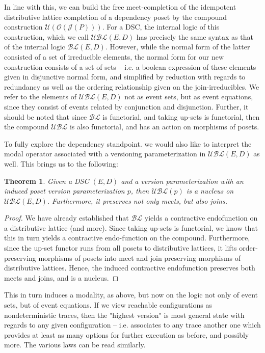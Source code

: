 \documentclass[hoptionsi,review,format=acmsmall]{acmart}
\newtheorem{theorem}{Theorem}[section]
\theoremstyle{definition}
\newcommand{\UBLc}{\mathcal{UBL}}
\newcommand{\Oc}{\mathcal{O}}
\newcommand{\Ucc}{\mathcal{U}}
\newcommand{\Jc}{\mathcal{J}}
\newcommand{\BLc}{\mathcal{BL}}
\begin{document}
 In line with this, we can build the free meet-completion of the idempotent distributive lattice completion of a dependency poset by the compound construction \(\Ucc(\Oc(\Jc(P)))\). For a DSC, the internal logic of this construction, which we call \(\UBLc(E,D)\) has precisely the same syntax as that of the internal logic \(\BLc(E,D)\). However, while the normal form of the latter consisted of a set of irreducible elements, the normal form for our new construction consists of a set of sets -- i.e. a boolean expression of these elements given in disjunctive normal form, and simplified by reduction with regards to redundancy as well as the ordering relationship given on the join-irreducibles. We refer to the elements of \(\UBLc(E,D)\) not as event sets, but as event equations, since they consist of events related by conjunction and disjunction. Further, it should be noted that since \(\BLc\) is functorial, and taking up-sets is functorial, then the compound \(\UBLc\) is also functorial, and has an action on morphisms of posets.
 


To fully explore the dependency standpoint. we would also like to interpret the modal operator associated with a versioning parameterization in \(\UBLc(E,D)\) as well. This brings us to the following:

\begin{theorem}
Given a DSC \((E,D)\) and a version parameterization with an induced poset version parameterization \(p\), then \(\UBLc(p)\) is a nucleus on \(\UBLc(E,D)\). Furthermore, it preserves not only meets, but also joins.
\end{theorem}
\begin{proof}
We have already established that \(\BLc\) yields a contractive endofunction on a distributive lattice (and more). Since taking up-sets is functorial, we know that this in turn yields a contractive endo-function on the compound. Furthermore, since the up-set functor runs from all posets to distributive lattices, it lifts order-preserving morphisms of posets into meet and join preserving morphisms of distributive lattices. Hence, the induced contractive endofunction preserves both meets and joins, and is a nucleus.
\end{proof}

This in turn induces a modality, as above, but now on the logic not only of event sets, but of event equations. If we view reachable configurations as nondeterministic traces, then the "highest version" is most general state with regards to any given configuration -- i.e. associates to any trace another one which provides at least as many options for further execution as before, and possibly more. The various laws can be read similarly. %
\end{document}
